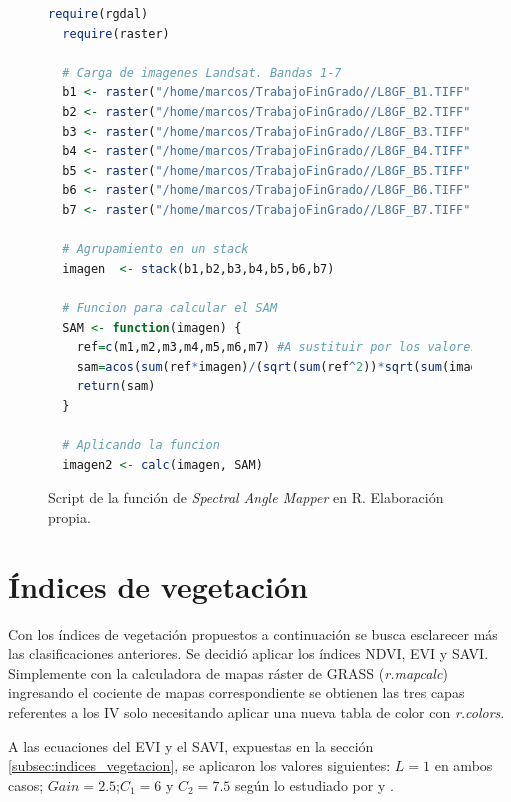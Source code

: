 \begin{figure}
\begin{lstlisting}[language = R]
  require(rgdal)
  require(raster)

  # Carga de imagenes Landsat. Bandas 1-7
  b1 <- raster("/home/marcos/TrabajoFinGrado//L8GF_B1.TIFF")
  b2 <- raster("/home/marcos/TrabajoFinGrado//L8GF_B2.TIFF")
  b3 <- raster("/home/marcos/TrabajoFinGrado//L8GF_B3.TIFF")
  b4 <- raster("/home/marcos/TrabajoFinGrado//L8GF_B4.TIFF")
  b5 <- raster("/home/marcos/TrabajoFinGrado//L8GF_B5.TIFF")
  b6 <- raster("/home/marcos/TrabajoFinGrado//L8GF_B6.TIFF")
  b7 <- raster("/home/marcos/TrabajoFinGrado//L8GF_B7.TIFF")

  # Agrupamiento en un stack
  imagen  <- stack(b1,b2,b3,b4,b5,b6,b7)

  # Funcion para calcular el SAM
  SAM <- function(imagen) {
    ref=c(m1,m2,m3,m4,m5,m6,m7) #A sustituir por los valores medios de reflectividad por banda
    sam=acos(sum(ref*imagen)/(sqrt(sum(ref^2))*sqrt(sum(imagen^2))))
    return(sam)
  }

  # Aplicando la funcion
  imagen2 <- calc(imagen, SAM)
\end{lstlisting}
\caption[Función de \textit{Spectral Angle Mapper}]{Script de la función de \textit{Spectral Angle Mapper} en R. Elaboración propia.}
\label{fig:R_SAM}
\end{figure}

\section{Índices de vegetación}
Con los índices de vegetación propuestos a continuación se busca esclarecer más las clasificaciones anteriores. Se decidió aplicar los índices \ac{NDVI}, \ac{EVI} y \ac{SAVI}. Simplemente con la calculadora de mapas ráster de GRASS (\textit{r.mapcalc}) ingresando el cociente de mapas correspondiente se obtienen las tres capas referentes a los \ac{IV} solo necesitando aplicar una nueva tabla de color con \textit{r.colors}.

A las ecuaciones del \ac{EVI} y el \ac{SAVI}, expuestas en la sección \ref{subsec:indices_vegetacion}, se aplicaron los valores siguientes: $L=1$ en ambos casos; $Gain=2.5 $;$C_{1}=6 $ y $C_{2}=7.5$ según lo estudiado por \cite{carvachobart2010} y \cite{crespo2000}.